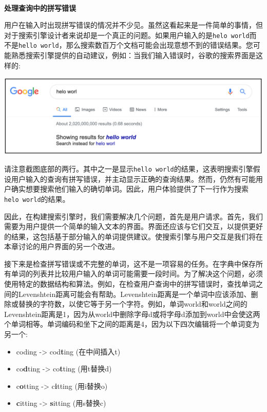 \noindent\textbf{}\ \par
\textbf{处理查询中的拼写错误} \ \par
用户在输入时出现拼写错误的情况并不少见。虽然这看起来是一件简单的事情，但对于搜索引擎设计者来说却是一个真正的问题。如果用户输入的是\texttt{helo world}而不是\texttt{hello world}，那么搜索数百万个文档可能会出现意想不到的错误结果。您可能熟悉搜索引擎提供的自动建议，例如：当我们输入错误时，谷歌的搜索界面是这样的: \par

\begin{center}
	\includegraphics[width=1.0\textwidth]{content/Section-3/Chapter-16/4}
\end{center}

请注意截图底部的两行。其中之一是显示\texttt{hello world}的结果，这表明搜索引擎假设用户输入的查询有拼写错误，并主动显示正确的查询结果。然而，仍然有可能用户确实想要搜索他们输入的确切单词。因此，用户体验提供了下一行作为搜索\texttt{helo world}的结果。 \par
因此，在构建搜索引擎时，我们需要解决几个问题，首先是用户请求。首先，我们需要为用户提供一个简单的输入文本的界面。界面还应该与它们交互，以提供更好的结果，这包括基于部分输入的单词提供建议。使搜索引擎与用户交互是我们将在本章讨论的用户界面的另一个改进。 \par
接下来是检查拼写错误或不完整的单词，这不是一项容易的任务。在字典中保存所有单词的列表并比较用户输入的单词可能需要一段时间。为了解决这个问题，必须使用特定的数据结构和算法。例如，在检查用户查询中的拼写错误时，查找单词之间的Levenshtein距离可能会有帮助。Levenshtein距离是一个单词中应该添加、删除或替换的字符数，以使它等于另一个字符。例如，单词world和world之间的Levenshtein距离是1，因为从world中删除字母d或将字母d添加到world中会使这两个单词相等。单词编码和坐下之间的距离是4，因为以下四次编辑将一个单词变为另一个: \par

\begin{itemize}
	\item coding -> cod\textbf{t}ing (在中间插入t) 
	\item co\textbf{d}ting -> co\textbf{t}ting (用t替换d) 
	\item c\textbf{o}tting -> c\textbf{i}tting (用i替换o) 
	\item \textbf{c}itting -> \textbf{s}itting (用s替换c) 
\end{itemize}

